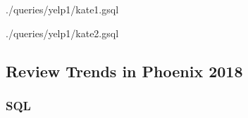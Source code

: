 

{./queries/yelp1/kate1.gsql}



{./queries/yelp1/kate2.gsql}

\subsection{Review Trends in Phoenix 2018}

\subsubsection{SQL}

